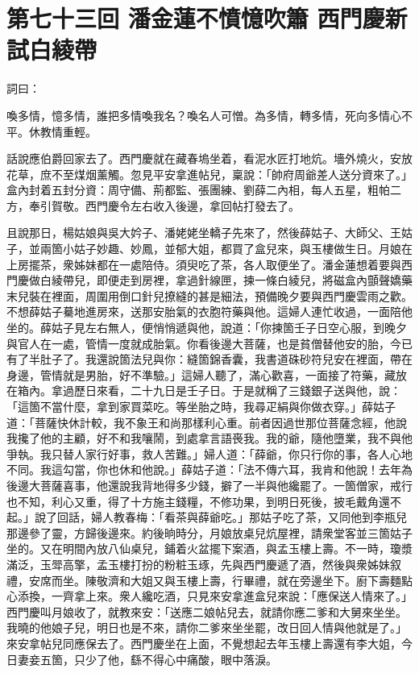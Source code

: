 
\chapter*{第七十三回 潘金蓮不憤憶吹簫 西門慶新試白綾帶}


詞曰：

\begin{myquote}
喚多情，憶多情，誰把多情喚我名？喚名人可憎。為多情，轉多情，死向多情心不平。休教情重輕。

\end{myquote}

話說應伯爵回家去了。西門慶就在藏春塢坐着，看泥水匠打地炕。墻外燒火，安放花草，庶不至煤烟薰觸。忽見平安拿進帖兒，稟說：「帥府周爺差人送分資來了。」盒內封着五封分資：周守備、荊都監、張團練、劉薛二內相，每人五星，粗帕二方，奉引賀敬。西門慶令左右收入後邊，拿回帖打發去了。

且說那日，楊姑娘與吳大妗子、潘姥姥坐轎子先來了，然後薛姑子、大師父、王姑子，並兩箇小姑子妙趣、妙鳳，並郁大姐，都買了盒兒來，與玉樓做生日。月娘在上房擺茶，衆姊妹都在一處陪侍。須臾吃了茶，各人取便坐了。潘金蓮想着要與西門慶做白綾帶兒，即便走到房裡，拿過針線匣，揀一條白綾兒，將磁盒內顫聲嬌藥末兒裝在裡面，周圍用倒口針兒撩縫的甚是細法，預備晚夕要與西門慶雲雨之歡。不想薛姑子驀地進房來，送那安胎氣的衣胞符藥與他。這婦人連忙收過，一面陪他坐的。薛姑子見左右無人，便悄悄遞與他，{}說道：「你揀箇壬子日空心服，到晚夕與官人在一處，管情一度就成胎氣。你看後邊大菩薩，也是貧僧替他安的胎，今已有了半肚子了。我還說箇法兒與你：縫箇錦香囊，我書道硃砂符兒安在裡面，帶在身邊，管情就是男胎，好不準驗。」{}這婦人聽了，滿心歡喜，一面接了符藥，藏放在箱內。拿過歷日來看，二十九日是壬子日。于是就稱了三錢銀子送與他，說：「這箇不當什麼，拿到家買菜吃。等坐胎之時，我尋疋絹與你做衣穿。」薛姑子道：「菩薩快休計較，我不象王和尚那樣利心重。{}前者因過世那位菩薩念經，他說我攙了他的主顧，好不和我嚷鬧，到處拿言語䘮我。我的爺，隨他墮業，我不與他爭執。我只替人家行好事，救人苦難。」婦人道：「薛爺，你只行你的事，各人心地不同。我這勾當，你也休和他說。」薛姑子道：「法不傳六耳，我肯和他說！去年為後邊大菩薩喜事，他還說我背地得多少錢，擗了一半與他纔罷了。一箇僧家，戒行也不知，利心又重，得了十方施主錢糧，不修功果，到明日死後，披毛戴角還不起。」說了回話，婦人教春梅：「看茶與薛爺吃。」那姑子吃了茶，又同他到李瓶兒那邊參了靈，方歸後邊來。約後晌時分，月娘放桌兒炕屋裡，請衆堂客並三箇姑子坐的。又在明間內放八仙桌兒，鋪着火盆擺下案酒，與孟玉樓上壽。不一時，瓊漿滿泛，玉斝高擎，孟玉樓打扮的粉粧玉琢，先與西門慶遞了酒，然後與衆姊妹叙禮，安席而坐。陳敬濟和大姐又與玉樓上壽，行畢禮，就在旁邊坐下。廚下壽麵點心添換，一齊拿上來。衆人纔吃酒，只見來安拿進盒兒來說：「應保送人情來了。」西門慶叫月娘收了，就教來安：「送應二娘帖兒去，就請你應二爹和大舅來坐坐。我曉的他娘子兒，明日也是不來，請你二爹來坐坐罷，改日回人情與他就是了。」來安拿帖兒同應保去了。西門慶坐在上面，不覺想起去年玉樓上壽還有李大姐，今日妻妾五箇，只少了他，繇不得心中痛酸，眼中落淚。{}

